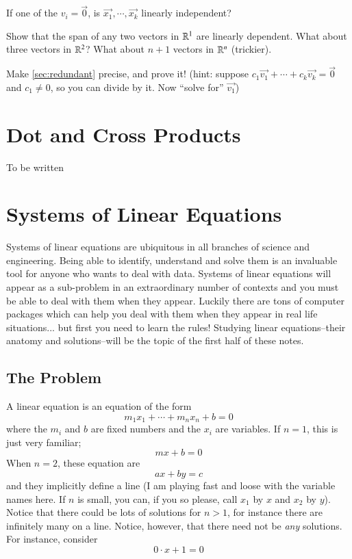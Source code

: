 \begin{UnimpEx}
  If one of the $v_i=\vec{0}$, is $\vec{x_1},\cdots,\vec{x_k}$ linearly independent?  
\end{UnimpEx}

\begin{Ex}
  Show that the span of any two vectors in $\mathbb{R}^1$ are linearly dependent.
  What about three vectors in $\mathbb{R}^2$?
  What about $n+1$ vectors in $\mathbb{R}^n$ (trickier).  
\end{Ex}

\begin{ImpEx}
  Make \ref{sec:redundant} precise, and prove it!
  (hint: suppose $c_1\vec{v_1}+\cdots+c_k\vec{v_k} = \vec{0}$ and $c_1\ne 0$, so you can divide by it.  Now ``solve for'' $\vec{v_1}$)
\end{ImpEx}


\section{Dot and Cross Products}

To be written

\section{Systems of Linear Equations}

Systems of linear equations are ubiquitous in all branches of science and engineering.
Being able to identify, understand and solve them is an invaluable tool for anyone who wants to deal with data.
Systems of linear equations will appear as a sub-problem in an extraordinary number of contexts and you must be able to deal with them when they appear.
Luckily there are tons of computer packages which can help you deal with them when they appear in real life situations... but first you need to learn the rules!
Studying linear equations--their anatomy and solutions--will be the topic of the first half of these notes.

\subsection{The Problem}

A linear equation is an equation of the form
\[m_1 x_1 + \cdots + m_n x_n + b = 0\]
where the $m_i$ and $b$ are fixed numbers and the $x_i$ are variables.  If $n=1$, this is just very familiar; 
\[mx +b = 0\]
When $n=2$, these equation are 
\[ax+by=c\]
and they implicitly define a line (I am playing fast and loose with the variable names here.  If $n$ is small, you can, if you so please, call $x_1$ by $x$ and $x_2$ by $y$).
Notice that there could be lots of solutions for $n> 1$, for instance there are infinitely many on a line.  
Notice, however, that there need not be \emph{any} solutions.  For instance, consider
\[0\cdot x + 1 = 0\]


